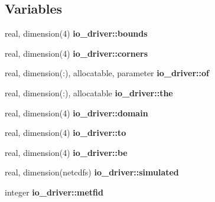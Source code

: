 \subsection*{Variables}
\begin{DoxyCompactItemize}
\item 
\hypertarget{namespaceio__driver_ac2db283431c25c0208231daa311d1206}{}real, dimension(4) {\bfseries io\+\_\+driver\+::bounds}\label{namespaceio__driver_ac2db283431c25c0208231daa311d1206}

\item 
\hypertarget{namespaceio__driver_a1f48d14e931a91cb17da7c4c9811aa15}{}real, dimension(4) {\bfseries io\+\_\+driver\+::corners}\label{namespaceio__driver_a1f48d14e931a91cb17da7c4c9811aa15}

\item 
\hypertarget{namespaceio__driver_a5ac3477e316a81290535a8c66d43ac44}{}real, dimension(\+:), allocatable, parameter {\bfseries io\+\_\+driver\+::of}\label{namespaceio__driver_a5ac3477e316a81290535a8c66d43ac44}

\item 
\hypertarget{namespaceio__driver_ab6ecb6f2223fb67b352c4c7ec179233b}{}real, dimension(\+:), allocatable {\bfseries io\+\_\+driver\+::the}\label{namespaceio__driver_ab6ecb6f2223fb67b352c4c7ec179233b}

\item 
\hypertarget{namespaceio__driver_af8c24d9e3573d3db6ba9e44b40acb95d}{}real, dimension(4) {\bfseries io\+\_\+driver\+::domain}\label{namespaceio__driver_af8c24d9e3573d3db6ba9e44b40acb95d}

\item 
\hypertarget{namespaceio__driver_ae1fb67c331e428065c93787a6226d032}{}real, dimension(4) {\bfseries io\+\_\+driver\+::to}\label{namespaceio__driver_ae1fb67c331e428065c93787a6226d032}

\item 
\hypertarget{namespaceio__driver_ae5fab4c3251a23871047b9f38c8e5830}{}real, dimension(4) {\bfseries io\+\_\+driver\+::be}\label{namespaceio__driver_ae5fab4c3251a23871047b9f38c8e5830}

\item 
\hypertarget{namespaceio__driver_a8df6af6f6d97507e408cf25e5fab490a}{}real, dimension(netcdfs) {\bfseries io\+\_\+driver\+::simulated}\label{namespaceio__driver_a8df6af6f6d97507e408cf25e5fab490a}

\item 
\hypertarget{namespaceio__driver_ac7fcc74c4d008f60a99ab24cdd3744d3}{}integer {\bfseries io\+\_\+driver\+::metfid}\label{namespaceio__driver_ac7fcc74c4d008f60a99ab24cdd3744d3}


\end{DoxyCompactItemize}
